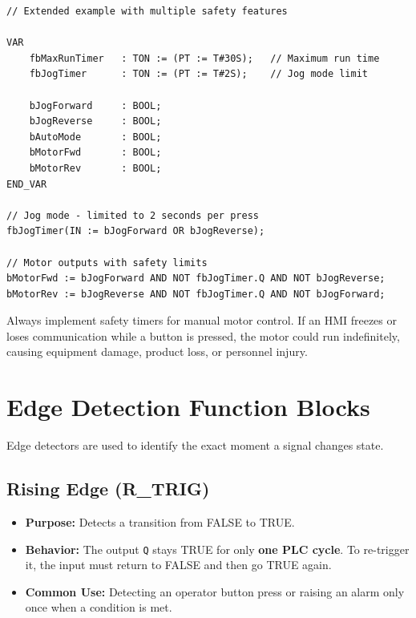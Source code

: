 \documentclass[11pt,a4paper]{article}
\begin{document}
\begin{lstlisting}
// Extended example with multiple safety features

VAR
    fbMaxRunTimer   : TON := (PT := T#30S);   // Maximum run time
    fbJogTimer      : TON := (PT := T#2S);    // Jog mode limit
    
    bJogForward     : BOOL;
    bJogReverse     : BOOL;
    bAutoMode       : BOOL;
    bMotorFwd       : BOOL;
    bMotorRev       : BOOL;
END_VAR

// Jog mode - limited to 2 seconds per press
fbJogTimer(IN := bJogForward OR bJogReverse);

// Motor outputs with safety limits
bMotorFwd := bJogForward AND NOT fbJogTimer.Q AND NOT bJogReverse;
bMotorRev := bJogReverse AND NOT fbJogTimer.Q AND NOT bJogForward;
\end{lstlisting}

\begin{warningbox}
Always implement safety timers for manual motor control. If an HMI freezes or loses communication while a button is pressed, the motor could run indefinitely, causing equipment damage, product loss, or personnel injury.
\end{warningbox}

\section{Edge Detection Function Blocks}

Edge detectors are used to identify the exact moment a signal changes state.

\subsection{Rising Edge (R\_TRIG)}

\begin{itemize}[leftmargin=*]
    \item \textbf{Purpose:} Detects a transition from FALSE to TRUE.
    \item \textbf{Behavior:} The output \texttt{Q} stays TRUE for only \textbf{one PLC cycle}. To re-trigger it, the input must return to FALSE and then go TRUE again.
    \item \textbf{Common Use:} Detecting an operator button press or raising an alarm only once when a condition is met.
\end{itemize}
\end{document}

